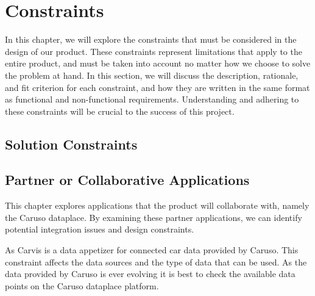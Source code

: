 \chapter{Constraints}

In this chapter, we will explore the constraints that must be considered in the design of our product. These constraints represent limitations that apply to the entire product, and must be taken into account no matter how we choose to solve the problem at hand. In this section, we will discuss the description, rationale, and fit criterion for each constraint, and how they are written in the same format as functional and non-functional requirements. Understanding and adhering to these constraints will be crucial to the success of this project.

\section{Solution Constraints}


\section{Partner or Collaborative Applications}

This chapter explores applications that the product will collaborate with, namely the Caruso dataplace. By examining these partner applications, we can identify potential integration issues and design constraints.

As Carvis is a data appetizer for connected car data provided by Caruso. This constraint affects the data sources and the type of data that can be used. As the data provided by Caruso is ever evolving it is best to check the available data points on the Caruso dataplace platform. 

